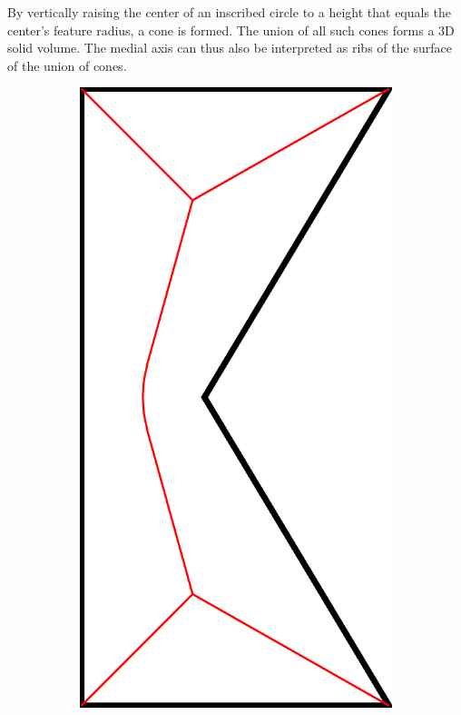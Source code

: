 By vertically raising the center of an inscribed circle to a height that equals the center's feature radius, a cone is formed. 
The union of all such cones forms a 3D solid volume. 
The medial axis can thus also be interpreted as ribs of the surface of the union of cones.~\cite{blum1967transformation}



\begin{figure}\centering
\setlength{\figwidth}{0.24\columnwidth}
\setlength{\figwidthTwo}{0.3\columnwidth}
\begin{subfigure}[t]{\figwidth}\centering
\includegraphics[height=\figwidthTwo]{sources/method/simple_skeleton_mat}

\end{subfigure}
\end{figure}
